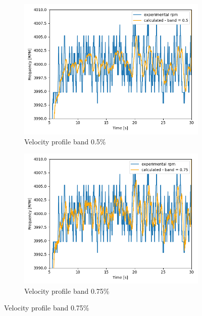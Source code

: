 \documentclass[10pt,fleqn,a4paper,twoside]{article}
\begin{document}
    
    \begin{figure}[H]

       
        \centering
        \begin{subfigure}{0.4\textwidth}
            \includegraphics[width=\textwidth]{Figures/rpm_analysis_mic4_band_0.5.png}
            \caption{Velocity profile band 0.5\%}
            \label{fig:second}
        \end{subfigure}
        \hfill
        \centering
        \begin{subfigure}{0.4\textwidth}
            \includegraphics[width=\textwidth]{Figures/rpm_analysis_mic4_band_0.75.png}
            \caption{Velocity profile band 0.75\%}

\end{subfigure}
\end{figure}
\end{document}
